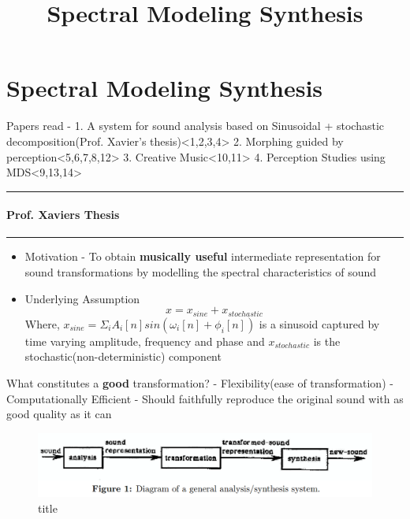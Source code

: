 \documentclass[11pt]{article}
\title{Spectral Modeling Synthesis}
\makeatletter
\def\maxwidth{\ifdim\Gin@nat@width>\linewidth\linewidth
    \else\Gin@nat@width\fi}
\let\Oldincludegraphics\includegraphics
\renewcommand{\includegraphics}[1]{\Oldincludegraphics[width=.8\maxwidth]{#1}}
\providecommand{\tightlist}{%
      \setlength{\itemsep}{0pt}\setlength{\parskip}{0pt}}
\makeatother
\begin{document}
    
    
    \maketitle
    
    

    
    \section{Spectral Modeling Synthesis}\label{spectral-modeling-synthesis}

Papers read - 1. A system for sound analysis based on Sinusoidal +
stochastic decomposition(Prof. Xavier's
thesis)\textless{}1,2,3,4\textgreater{} 2. Morphing guided by
perception\textless{}5,6,7,8,12\textgreater{} 3. Creative
Music\textless{}10,11\textgreater{} 4. Perception Studies using
MDS\textless{}9,13,14\textgreater{}

    \begin{center}\rule{0.5\linewidth}{\linethickness}\end{center}

\paragraph{Prof. Xaviers Thesis}\label{prof.-xaviers-thesis}

\begin{center}\rule{0.5\linewidth}{\linethickness}\end{center}

    \begin{itemize}
\tightlist
\item
  Motivation - To obtain \textbf{musically useful} intermediate
  representation for sound transformations by modelling the spectral
  characteristics of sound
\item
  Underlying Assumption \[ x = x_{sine} + x_{stochastic}\] Where,
  \(x_{sine} = \Sigma_{i} A_{i}[n]sin(\omega_{i}[n] + \phi_{i}[n])\) is
  a sinusoid captured by time varying amplitude, frequency and phase and
  \(x_{stochastic}\) is the stochastic(non-deterministic) component
\end{itemize}

    What constitutes a \textbf{good} transformation? - Flexibility(ease of
transformation) - Computationally Efficient - Should faithfully
reproduce the original sound with as good quality as it can

    \begin{figure}
\centering
\includegraphics{fig_1.png}
\caption{title}
\end{figure}
\end{document}
